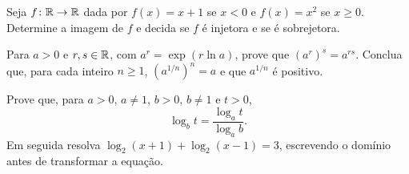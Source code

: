 \documentclass[11pt,a4paper]{article}
\begin{document}
\begin{exercicio}
Seja $f\colon\mathbb{R}\to\mathbb{R}$ dada por $f(x)=x+1$ se $x<0$ e $f(x)=x^2$ se $x\ge 0$. Determine a imagem de $f$ e decida se $f$ é injetora e se é sobrejetora.
\end{exercicio}

\begin{exercicio}
Para $a>0$ e $r,s\in\mathbb{R}$, com $a^r=\exp(r\ln a)$, prove que $(a^r)^s=a^{rs}$. Conclua que, para cada inteiro $n\ge 1$, $(a^{1/n})^n=a$ e que $a^{1/n}$ é positivo.
\end{exercicio}

\begin{exercicio}
Prove que, para $a>0$, $a\neq 1$, $b>0$, $b\neq 1$ e $t>0$,
\[
\log_b t=\frac{\log_a t}{\log_a b}.
\]
Em seguida resolva $\log_2(x+1)+\log_2(x-1)=3$, escrevendo o domínio antes de transformar a equação.
\end{exercicio}
\end{document}
